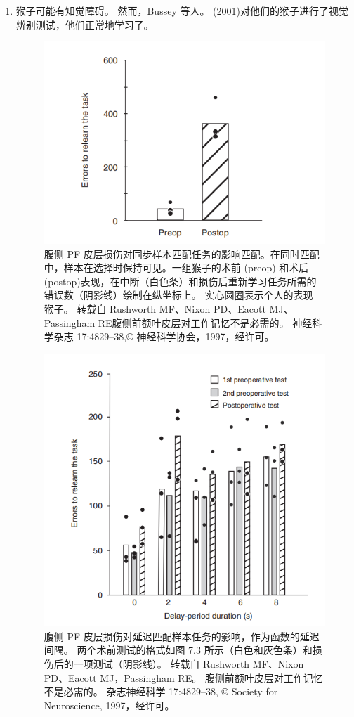 \begin{enumerate}
\item 猴子可能有知觉障碍。 然而，Bussey 等人。 (2001)对他们的猴子进行了视觉辨别测试，他们正常地学习了。
\begin{figure}
	\centering
	\includegraphics[width=0.6\linewidth]{image_pfc/Fig_7_3}
	\caption{腹侧 PF 皮层损伤对同步样本匹配任务的影响匹配。在同时匹配中，样本在选择时保持可见。一组猴子的术前 (preop) 和术后 (postop)表现，在中断（白色条）和损伤后重新学习任务所需的错误数（阴影线）绘制在纵坐标上。 实心圆圈表示个人的表现
	猴子。 转载自 Rushworth MF、Nixon PD、Eacott MJ、Passingham RE腹侧前额叶皮层对工作记忆不是必需的。 神经科学杂志 17:4829–38,© 神经科学协会，1997，经许可。}
	\label{fig:fig}
\end{figure}
\begin{figure}
	\centering
	\includegraphics[width=0.6\linewidth]{image_pfc/Fig_7_4}
	\caption{腹侧 PF 皮层损伤对延迟匹配样本任务的影响，作为函数的延迟间隔。 两个术前测试的格式如图 7.3 所示（白色和灰色条）和损伤后的一项测试（阴影线）。 转载自 Rushworth MF、Nixon PD、Eacott MJ，Passingham RE。 腹侧前额叶皮层对工作记忆不是必需的。 杂志神经科学 17:4829–38, © Society for Neuroscience, 1997，经许可。}
	\label{fig:fig}
\end{figure}

\end{enumerate}
